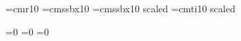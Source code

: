 
\font\mainfont=cmr10
\font\chheadfont=cmssbx10
\font\bkheadfont=cmssbx10 scaled 
\font\titlefont=cmti10 scaled 

=0
=0
=0

\def\title#1{\centerline{\titlefont #1}}

\def\version#1{\def\versionname{The #1 Version}}

\def\testament#1{\rightline{\titlefont The #1 Testament}}




